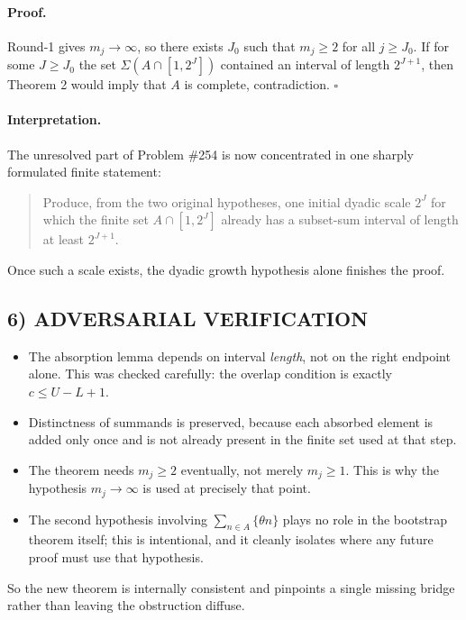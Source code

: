 \paragraph{Proof.}
Round-1 gives $m_j\to\infty$, so there exists $J_0$ such that $m_j\ge 2$ for all $j\ge J_0$. If for some $J\ge J_0$ the set $\Sigma(A\cap[1,2^J])$ contained an interval of length $2^{J+1}$, then Theorem 2 would imply that $A$ is complete, contradiction.
\hfill$\square$

\medskip

\paragraph{Interpretation.}
The unresolved part of Problem \#254 is now concentrated in one sharply formulated finite statement:

\begin{quote}
Produce, from the two original hypotheses, one initial dyadic scale $2^J$ for which the finite set $A\cap[1,2^J]$ already has a subset-sum interval of length at least $2^{J+1}$.
\end{quote}

Once such a scale exists, the dyadic growth hypothesis alone finishes the proof.

\subsection*{6) ADVERSARIAL VERIFICATION}

\begin{itemize}
\item The absorption lemma depends on interval \emph{length}, not on the right endpoint alone. This was checked carefully: the overlap condition is exactly $c\le U-L+1$.
\item Distinctness of summands is preserved, because each absorbed element is added only once and is not already present in the finite set used at that step.
\item The theorem needs $m_j\ge 2$ eventually, not merely $m_j\ge 1$. This is why the hypothesis $m_j\to\infty$ is used at precisely that point.
\item The second hypothesis involving $\sum_{n\in A}\{\theta n\}$ plays no role in the bootstrap theorem itself; this is intentional, and it cleanly isolates where any future proof must use that hypothesis.
\end{itemize}

So the new theorem is internally consistent and pinpoints a single missing bridge rather than leaving the obstruction diffuse.

